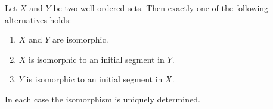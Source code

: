 Let $X$ and $Y$ be two well-ordered sets. Then exactly one of the following alternatives holds:
\begin{enumerate}
\item[(a)] $X$ and $Y$ are isomorphic.
\item[(b)] $X$ is isomorphic to an initial segment in $Y$.
\item[(c)] $Y$ is isomorphic to an initial segment in $X$.
\end{enumerate}
In each case the isomorphism is uniquely determined.

